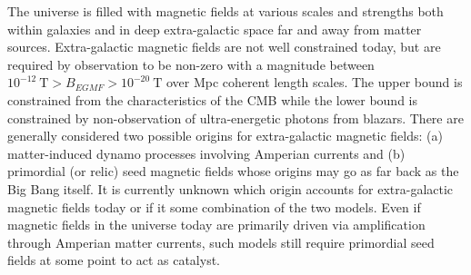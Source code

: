 \documentclass[Universe,article,submit,moreauthors,pdftex]{Definitions/mdpi}
\begin{document}
The universe is filled with magnetic fields at various scales and strengths both within galaxies and in deep extra-galactic space far and away from matter sources. Extra-galactic magnetic fields are not well constrained today, but are required by observation to be non-zero with a magnitude between $10^{-12}\ \mathrm{T}>B_{EGMF}>10^{-20}\ \mathrm{T}$ over Mpc coherent length scales. The upper bound is constrained from the characteristics of the CMB while the lower bound is constrained by non-observation of ultra-energetic photons from blazars. There are generally considered two possible origins for extra-galactic magnetic fields: (a) matter-induced dynamo processes involving Amperian currents and (b) primordial (or relic) seed magnetic fields whose origins may go as far back as the Big Bang itself. It is currently unknown which origin accounts for extra-galactic magnetic fields today or if it some combination of the two models. Even if magnetic fields in the universe today are primarily driven via amplification through Amperian matter currents, such models still require primordial seed fields at some point to act as catalyst.
\end{document}
